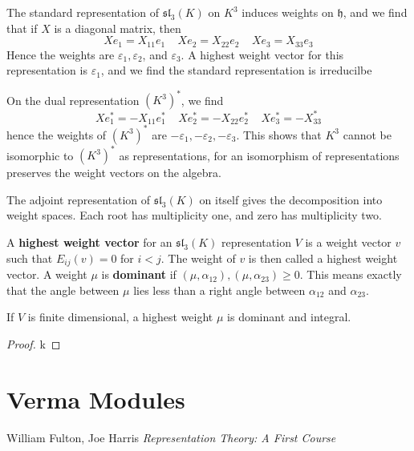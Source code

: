 \begin{example}
    The standard representation of $\mathfrak{sl}_3(K)$ on $K^3$ induces weights on $\mathfrak{h}$, and we find that if $X$ is a diagonal matrix, then
    \[ Xe_1 = X_{11} e_1\ \ \ \ \ Xe_2 = X_{22} e_2\ \ \ \ \ Xe_3 = X_{33} e_3 \]
    Hence the weights are $\varepsilon_1, \varepsilon_2$, and $\varepsilon_3$. A highest weight vector for this representation is $\varepsilon_1$, and we find the standard representation is irreducilbe 

    On the dual representation $(K^3)^*$, we find
    \[ Xe_1^* = - X_{11}e_1^*\ \ \ \ \ Xe_2^* = -X_{22} e_2^*\ \ \ \ \ Xe_3^* = -X_{33}^* \]
    hence the weights of $(K^3)^*$ are $-\varepsilon_1, -\varepsilon_2, -\varepsilon_3$. This shows that $K^3$ cannot be isomorphic to $(K^3)^*$ as representations, for an isomorphism of representations preserves the weight vectors on the algebra.
\end{example}

\begin{example}
    The adjoint representation of $\mathfrak{sl}_3(K)$ on itself gives the decomposition into weight spaces. Each root has multiplicity one, and zero has multiplicity two.
\end{example}



A {\bf highest weight vector} for an $\mathfrak{sl}_3(K)$ representation $V$ is a weight vector $v$ such that $E_{ij}(v) = 0$ for $i < j$. The weight of $v$ is then called a highest weight vector. A weight $\mu$ is {\bf dominant} if $(\mu, \alpha_{12}), (\mu, \alpha_{23}) \geq 0$. This means exactly that the angle between $\mu$ lies less than a right angle between $\alpha_{12}$ and $\alpha_{23}$.

\begin{lemma}
    If $V$ is finite dimensional, a highest weight $\mu$ is dominant and integral.
\end{lemma}
\begin{proof}
    k
\end{proof}














\chapter{Verma Modules}








\begin{thebibliography}{9}

William Fulton, Joe Harris
\textit{Representation Theory: A First Course}

\end{thebibliography}

